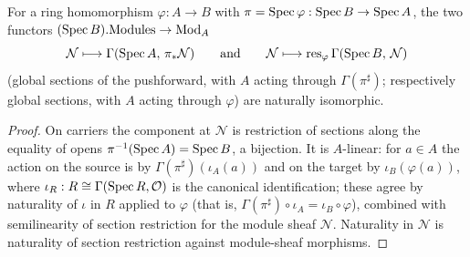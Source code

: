 \begin{lemma}
  \label{lem:pullbackTilde_gammaBridge}
  \leanok
  For a ring homomorphism \(\varphi : A \to B\) with
  \(\pi = \operatorname{Spec}\varphi : \operatorname{Spec} B \to \operatorname{Spec} A\), the two functors
  \((\operatorname{Spec} B).\mathrm{Modules} \to \mathrm{Mod}_{A}\)
  \[
    \mathcal N \longmapsto \Gamma(\operatorname{Spec} A,\, \pi_{*}\mathcal N)
    \qquad\text{and}\qquad
    \mathcal N \longmapsto \mathrm{res}_{\varphi}\, \Gamma(\operatorname{Spec} B,\, \mathcal N)
  \]
  (global sections of the pushforward, with \(A\) acting through
  \(\Gamma(\pi^{\sharp})\); respectively global sections, with \(A\)
  acting through \(\varphi\)) are naturally isomorphic.
\end{lemma}
\begin{proof}
  \leanok
  On carriers the component at \(\mathcal N\) is restriction of sections
  along the equality of opens \(\pi^{-1}(\operatorname{Spec} A) = \operatorname{Spec} B\), a
  bijection. It is \(A\)-linear: for \(a \in A\) the action on the
  source is by \(\Gamma(\pi^{\sharp})(\iota_A(a))\) and on the target by
  \(\iota_B(\varphi(a))\), where
  \(\iota_R : R \cong \Gamma(\operatorname{Spec} R, \mathcal O)\) is the canonical
  identification; these agree by naturality of \(\iota\) in \(R\)
  applied to \(\varphi\) (that is,
  \(\Gamma(\pi^{\sharp}) \circ \iota_A = \iota_B \circ \varphi\)),
  combined with semilinearity of section restriction for the module
  sheaf \(\mathcal N\). Naturality in \(\mathcal N\) is naturality of
  section restriction against module-sheaf morphisms.
\end{proof}


